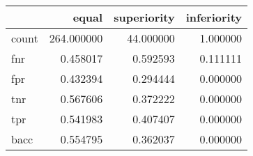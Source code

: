 \begin{tabular}{lrrr}
\toprule
{} &       equal &  superiority &  inferiority \\
\midrule
count &  264.000000 &    44.000000 &     1.000000 \\
fnr   &    0.458017 &     0.592593 &     0.111111 \\
fpr   &    0.432394 &     0.294444 &     0.000000 \\
tnr   &    0.567606 &     0.372222 &     0.000000 \\
tpr   &    0.541983 &     0.407407 &     0.000000 \\
bacc  &    0.554795 &     0.362037 &     0.000000 \\
\bottomrule
\end{tabular}
